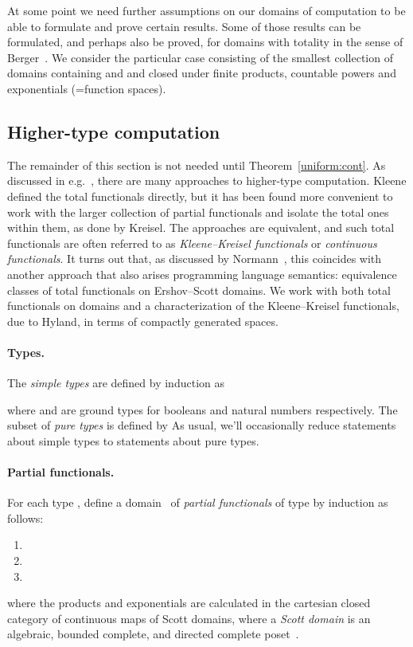 \documentclass{LMCS}
\newcommand{\myparagraph}{\paragraph}
\newcommand{\licsmath}[1]{}
\newcommand{\licsmathtt}[3]{\begin{enumerate}
\item[] \quad 
\item[] \quad 
\item[] \quad 
\end{enumerate}}
\newcommand{\bnf}{\mathrel{::=}}
\newcommand{\pN}{\mathcal{N}}
\newcommand{\pBool}{\mathcal{B}}
\newcommand{\tproduct}{\sigma \times \tau}
\newcommand{\tfunction}{\sigma \to \tau}
\begin{document}
At some point we need further assumptions on our domains of
computation to be able to formulate and prove certain results. Some of
those results can be formulated, and perhaps also be proved, for
domains with totality in the sense of Berger~\cite{berger:total}.  We
consider the particular case consisting of the smallest collection of
domains containing  and  and closed under finite
products, countable powers and exponentials (=function spaces).

\subsection{Higher-type computation} \label{higher:background}

The remainder of this section is not needed until
Theorem~\ref{uniform:cont}.  As discussed in
e.g.~\cite{normann:computer,MR2143877,longley:ubiquitous}, there are
many approaches to higher-type computation.  Kleene defined the total
functionals directly, but it has been found more convenient to work
with the larger collection of partial functionals and isolate the
total ones within them, as done by Kreisel. The approaches are
equivalent, and such total functionals are often referred to as
\emph{Kleene--Kreisel functionals} or \emph{continuous functionals}.
It turns out that, as discussed by Normann~\cite{normann:computer},
this coincides with another approach that also arises programming
language semantics: equivalence classes of total functionals on
Ershov--Scott domains.  We work with both total functionals on domains
and a characterization of the Kleene--Kreisel functionals, due to
Hyland, in terms of compactly generated spaces.


\myparagraph{Types.}  The \emph{simple types} are defined by induction
as
\licsmath{\sigma,\tau \bnf o \mid \iota \mid \tproduct \mid \tfunction,}
where  and  are ground types for booleans and natural
numbers respectively.  The subset of \emph{pure types} is defined by
\licsmath{\sigma \bnf \iota \mid \sigma \to \iota.}  As usual, we'll
occasionally reduce statements about simple types to statements about
pure types.


\myparagraph{Partial functionals.}  
For each type , define a domain~ of
\emph{partial functionals} of type  by induction as follows:
\licsmathtt{\domain{o} = \pBool, \quad \domain{\iota} = \pN,}
{\domain{\tproduct} = \domain{\sigma} \times
  \domain{\tau},}{\domain{\tfunction} = (\domain{\sigma} \to
  \domain{\tau}) = \domain{\tau}^{\domain{\sigma}}} where the products
and exponentials are calculated in the cartesian closed category of
continuous maps of Scott domains, where a \emph{Scott domain} is an
algebraic, bounded complete, and directed complete
poset~\cite{abramsky:jung}.
\end{document}
